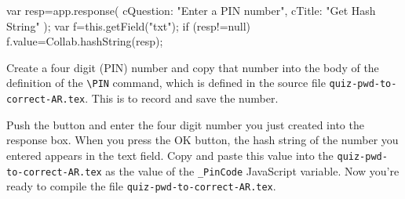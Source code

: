 \documentclass{article}
\begin{document}
\begin{defineJS}{\btnAct}
var resp=app.response({
  cQuestion: "Enter a PIN number",
  cTitle: "Get Hash String"
});
var f=this.getField("txt");
if (resp!=null) f.value=Collab.hashString(resp);
\end{defineJS}

Create a four digit (PIN) number and copy that number into the body of the
definition of the \verb|\PIN| command, which is defined in the source file
\texttt{quiz-pwd-to-correct-AR.tex}. This is to record and save the number.

Push the button and enter the four digit number you just created into the
response box. When you press the  \textsf{OK} button, the hash string of the
number you entered appears in the text field. Copy and paste this value into
the \texttt{quiz-pwd-to-correct-AR.tex} as the value of the
\texttt{\_PinCode} JavaScript variable. Now you're ready to compile the file
\texttt{quiz-pwd-to-correct-AR.tex}.

\olBdry
{}\olBdry
{}
\end{document}
